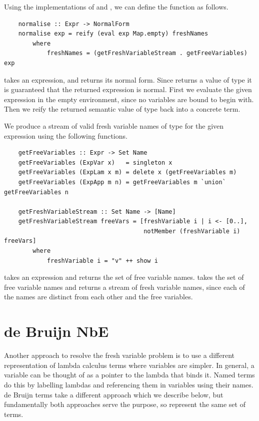 Using the implementations of  and , we can define the  function as follows.

\begin{lstlisting}
    normalise :: Expr -> NormalForm
    normalise exp = reify (eval exp Map.empty) freshNames
        where
            freshNames = (getFreshVariableStream . getFreeVariables) exp
\end{lstlisting}

 takes an expression, and returns its normal form. Since  returns a value of type  it is guaranteed that the returned expression is normal. First we evaluate the given expression in the empty environment, since no variables are bound to begin with. Then we reify the returned semantic value of type  back into a concrete  term.

We produce a stream of valid fresh variable names  of type \code{[Name]} for the given expression using the following functions.

\begin{lstlisting}
    getFreeVariables :: Expr -> Set Name
    getFreeVariables (ExpVar x)   = singleton x
    getFreeVariables (ExpLam x m) = delete x (getFreeVariables m)
    getFreeVariables (ExpApp m n) = getFreeVariables m `union` getFreeVariables n

    getFreshVariableStream :: Set Name -> [Name]
    getFreshVariableStream freeVars = [freshVariable i | i <- [0..], 
                                       notMember (freshVariable i) freeVars] 
        where
            freshVariable i = "v" ++ show i
\end{lstlisting}

 takes an expression and returns the set of free variable names.  takes the set of free variable names and returns a stream of fresh variable names, since each of the names are distinct from each other and the free variables.

\section{de Bruijn NbE}

Another approach to resolve the fresh variable problem is to use a different representation of lambda calculus terms where variables are simpler. In general, a variable can be thought of as a pointer to the lambda that binds it. Named terms do this by labelling lambdas and referencing them in variables using their names. de Bruijn terms take a different approach which we describe below, but fundamentally both approaches serve the purpose, so represent the same set of terms.

